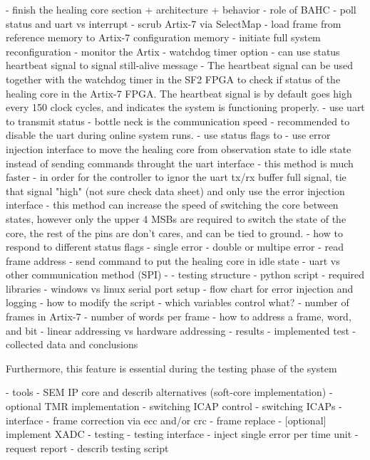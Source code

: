 - finish the healing core section
    + architecture
    + behavior
    - role of BAHC
        - poll status and uart vs interrupt
        - scrub Artix-7 via SelectMap
        - load frame from reference memory to Artix-7 configuration memory
        - initiate full system reconfiguration
        - monitor the Artix
        - watchdog timer option
            - can use status heartbeat signal to signal still-alive message
            - The heartbeat signal can be used together with the watchdog timer in the SF2 FPGA to check if status of the healing core in the Artix-7 FPGA. The heartbeat signal is by default goes high every 150 clock cycles, and indicates the system is functioning properly.
        - use uart to transmit status
            - bottle neck is the communication speed
            - recommended to disable the uart during online system runs.
            - use status flags to
        - use error injection interface to move the healing core from observation state to idle state instead of sending commands throught the uart interface
            - this method is much faster
            - in order for the controller to ignor the uart tx/rx buffer full signal, tie that signal "high" (not sure check data sheet)
            and only use the error injection interface
            - this method can increase the speed of switching the core between states, however only the upper 4 MSBs are required to switch the state of the core, the rest of the pins are don't cares, and can be tied to ground.
        - how to respond to different status flags
            - single error
            - double or multipe error
            - read frame address
            - send command to put the healing core in idle state
            - uart vs other communication method (SPI)
            - 
        - testing structure
            - python script
                - required libraries
                - windows vs linux serial port setup
                - flow chart for error injection and logging
                - how to modify the script
                    - which variables control what?
                - number of frames in Artix-7
                - number of words per frame
                - how to address a frame, word, and bit
                    - linear addressing vs hardware addressing
        - results
            - implemented test
            - collected data and conclusions

Furthermore, this feature is essential during the testing phase of the system

  - tools
  - SEM IP core and describ alternatives (soft-core implementation)
    - optional TMR implementation
    - switching ICAP control
    - switching ICAPs
    - interface
    - frame correction via ecc and/or crc
    - frame replace 
  - [optional] implement XADC
  - testing 
    - testing interface
	  - inject single error per time unit
	  - request report
	  - describ testing script

